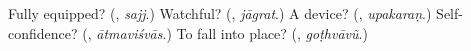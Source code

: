 \begin{tcolorbox}[breakable,colback=teal!4,colframe=teal!35!black,title={Before you move on}]
Fully equipped? (\textbf{}, \emph{sajj}.) Watchful? (\textbf{}, \emph{jāgrat}.) A device? (\textbf{}, \emph{upakaraṇ}.) Self-confidence? (\textbf{}, \emph{ātmaviśvās}.) To fall into place? (\textbf{}, \emph{goṭhvāvũ}.)
\end{tcolorbox}
